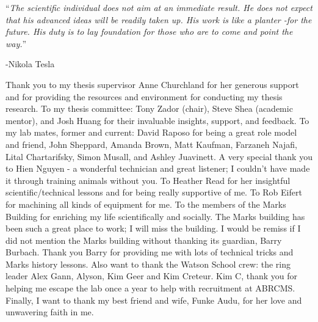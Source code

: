 \documentclass[
11pt, %
oneside, %
english, %
doublespacing, %
parskip, %
headsepline, %
]{MastersDoctoralThesis} %
\begin{document}

\vspace*{0.2\textheight}

\noindent\enquote{\itshape The scientific individual does not aim at an immediate result. He does not expect that his advanced ideas will be readily taken up. His work is like a planter -for the future. His duty is to lay foundation for those who are to come and point the way.}\bigbreak

\hfill -Nikola Tesla

\vspace*{0.2\textheight}

\begin{acknowledgements}
 \addchaptertocentry{\acknowledgementname} %
Thank you to my thesis supervisor Anne Churchland for her generous support and for providing the resources and environment for conducting my thesis research. To my thesis committee: Tony Zador (chair), Steve Shea (academic mentor), and Josh Huang for their invaluable insights, support, and feedback. To my lab mates, former and current: David Raposo for being a great role model and friend, John Sheppard, Amanda Brown, Matt Kaufman, Farzaneh Najafi, Lital Chartarifsky, Simon Musall, and Ashley Juavinett. A very special thank you to Hien Nguyen - a wonderful technician and great listener; I couldn't have made it through training animals without you. To Heather Read for her insightful scientific/technical lessons and for being really supportive of me. To Rob Eifert for machining all kinds of equipment for me. To the members of the Marks Building for enriching my life scientifically and socially. The Marks building has been such a great place to work; I will miss the building. I would be remiss if I did not mention the Marks building without thanking its guardian, Barry Burbach. Thank you Barry for providing me with lots of technical tricks and Marks history lessons. Also want to thank the Watson School crew: the ring leader Alex Gann, Alyson, Kim Geer and Kim Creteur. Kim C, thank you for helping me escape the lab once a year to help with recruitment at ABRCMS. \\
Finally, I want to thank my best friend and wife, Funke Audu, for her love and unwavering faith in me. 

\end{acknowledgements}
\end{document}
